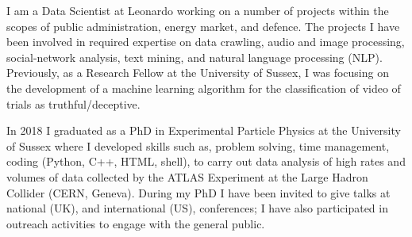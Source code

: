 
I am a Data Scientist at Leonardo working on a number of projects within the scopes of public administration, energy market, and defence. The projects I have been involved in required expertise on data crawling, audio and image processing, social-network analysis, text mining, and natural language processing (NLP). Previously, as a Research Fellow at the University of Sussex, I was focusing on the development of a machine learning algorithm for the classification of video of trials as truthful/deceptive. 

In 2018 I graduated as a PhD in Experimental Particle Physics at the University of Sussex where I developed skills such as, problem solving, time management, coding (Python, C++, HTML, shell), to carry out data analysis of high rates and volumes of data collected by the ATLAS Experiment at the Large Hadron Collider (CERN, Geneva). During my PhD I have been invited to give talks at national (UK), and international (US), conferences; I have also participated in outreach activities to engage with the general public.